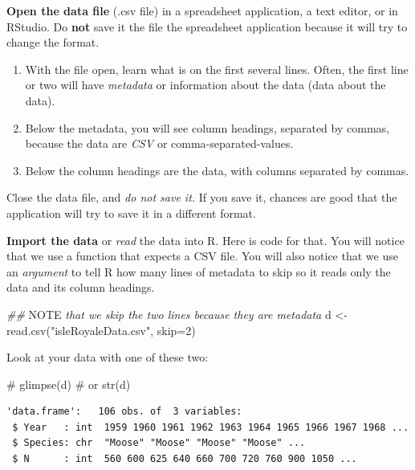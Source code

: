 \documentclass[
  letterpaper,
  DIV=11,
  numbers=noendperiod]{scrreprt}
\newenvironment{Shaded}{\begin{snugshade}}{\end{snugshade}}
\newcommand{\AlertTok}[1]{\textcolor[rgb]{0.68,0.00,0.00}{#1}}
\newcommand{\AttributeTok}[1]{\textcolor[rgb]{0.40,0.45,0.13}{#1}}
\newcommand{\CommentTok}[1]{\textcolor[rgb]{0.37,0.37,0.37}{#1}}
\newcommand{\DecValTok}[1]{\textcolor[rgb]{0.68,0.00,0.00}{#1}}
\newcommand{\DocumentationTok}[1]{\textcolor[rgb]{0.37,0.37,0.37}{\textit{#1}}}
\newcommand{\FunctionTok}[1]{\textcolor[rgb]{0.28,0.35,0.67}{#1}}
\newcommand{\NormalTok}[1]{\textcolor[rgb]{0.00,0.23,0.31}{#1}}
\newcommand{\OtherTok}[1]{\textcolor[rgb]{0.00,0.23,0.31}{#1}}
\newcommand{\StringTok}[1]{\textcolor[rgb]{0.13,0.47,0.30}{#1}}
\providecommand{\tightlist}{%
  \setlength{\itemsep}{0pt}\setlength{\parskip}{0pt}}
\begin{document}
\textbf{Open the data file} (.csv file) in a spreadsheet application, a
text editor, or in RStudio. Do \textbf{not} save it the file the
spreadsheet application because it will try to change the format.

\begin{enumerate}
\def\labelenumi{\arabic{enumi}.}
\tightlist
\item
  With the file open, learn what is on the first several lines. Often,
  the first line or two will have \emph{metadata} or information about
  the data (data about the data).
\item
  Below the metadata, you will see column headings, separated by commas,
  because the data are \emph{CSV} or comma-separated-values.
\item
  Below the column headings are the data, with columns separated by
  commas.
\end{enumerate}

Close the data file, and \emph{do not save it.} If you save it, chances
are good that the application will try to save it in a different format.

\textbf{Import the data} or \emph{read} the data into R. Here is code
for that. You will notice that we use a function that expects a CSV
file. You will also notice that we use an \emph{argument} to tell R how
many lines of metadata to skip so it reads only the data and its column
headings.

\begin{Shaded}
\begin{Highlighting}[]
\DocumentationTok{\#\# }\AlertTok{NOTE}\DocumentationTok{ that we skip the two lines because they are metadata}
\NormalTok{d }\OtherTok{\textless{}{-}} \FunctionTok{read.csv}\NormalTok{(}\StringTok{"isleRoyaleData.csv"}\NormalTok{,}
              \AttributeTok{skip=}\DecValTok{2}\NormalTok{)}
\end{Highlighting}
\end{Shaded}

Look at your data with one of these two:

\begin{Shaded}
\begin{Highlighting}[]
\CommentTok{\# glimpse(d)}
\CommentTok{\# or }
\FunctionTok{str}\NormalTok{(d)}
\end{Highlighting}
\end{Shaded}

\begin{verbatim}
'data.frame':   106 obs. of  3 variables:
 $ Year   : int  1959 1960 1961 1962 1963 1964 1965 1966 1967 1968 ...
 $ Species: chr  "Moose" "Moose" "Moose" "Moose" ...
 $ N      : int  560 600 625 640 660 700 720 760 900 1050 ...
\end{verbatim}
\end{document}
